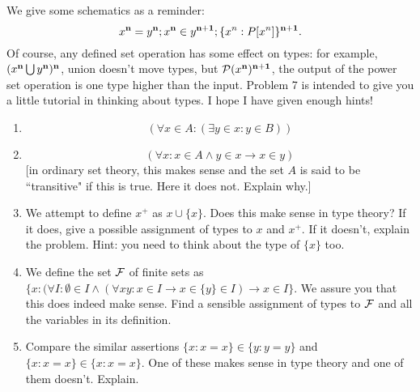 \documentclass[12pt]{book}
\begin{document}
\begin{enumerate}
We give some schematics as a reminder:  $$x^{\bf n} = y^{\bf n};  x^{\bf n} \in y^{\bf n+1};  \{x^n:P[x^n]\}^{\bf n+1}.$$  Of course, any defined set operation has
some effect on types:  for example, $(x^{\bf n} \bigcup y^{\bf n})^{\bf n}$, union doesn't move types, but ${\cal P}(x^{\bf n})^{\bf n+1}$, the output of the power set operation is one type higher than the input.  Problem 7 is intended to give you a little tutorial in thinking about types.  I hope I have given enough hints!

\begin{enumerate}

\item  $$(\forall x \in A:(\exists y \in x:y \in B))$$

\item  $$(\forall x:x \in A \wedge y \in x \rightarrow x \in y)$$ [in ordinary set theory, this makes sense and the set $A$ is said to be ``transitive" if this is true.  Here it does not.  Explain why.]

\item  We attempt to define $x^+$ as $x \cup \{x\}$.  Does this make sense in type theory?   If it does, give a possible assignment of types to $x$ and $x^+$.  If it doesn't, explain the problem.  Hint:  you need to think about the type of $\{x\}$ too.

\item  We define the set $\cal F$ of finite sets as $\{x : (\forall I:\emptyset \in I \wedge (\forall xy:x \in I \rightarrow x \in \{y\} \in I) \rightarrow x \in I\}$.  We assure you that this
does indeed make sense.  Find a sensible assignment of types to $\cal F$ and all the variables in its definition.

\item  Compare the similar assertions $\{x :x=x\} \in \{y:y=y\}$ and $\{x :x=x\} \in \{x:x=x\}$.  One of these makes sense in type theory and one of them doesn't.  Explain.

\end{enumerate}

\end{enumerate}

\newpage
\end{document}
